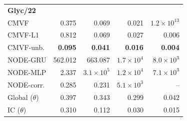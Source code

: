 \begin{tabular*}{\linewidth}{@{\extracolsep{\fill}}lrrrr}
\midrule
\multicolumn{5}{l}{\textbf{Glyc/22}} \\
CMVF & 0.375 & 0.069 & 0.021 & $1.2\!\times\!10^{13}$ \\
CMVF-L1 & 0.812 & 0.069 & 0.027 & 0.006 \\
CMVF-unb. & \textbf{0.095} & \textbf{0.041} & \textbf{0.016} & \textbf{0.004} \\
NODE-GRU & 562.012 & 663.087 & $1.7\!\times\!10^{4}$ & $8.0\!\times\!10^{3}$ \\
NODE-MLP & 2.337 & $3.1\!\times\!10^{5}$ & $1.2\!\times\!10^{4}$ & $7.1\!\times\!10^{3}$ \\
NODE-corr. & 0.285 & 0.231 & $5.1\!\times\!10^{3}$ & -- \\
Global ($\theta$) & 0.397 & 0.343 & 0.299 & 0.042 \\
IC ($\theta$) & 0.310 & 0.112 & 0.030 & 0.015 \\
\bottomrule
\end{tabular*}
